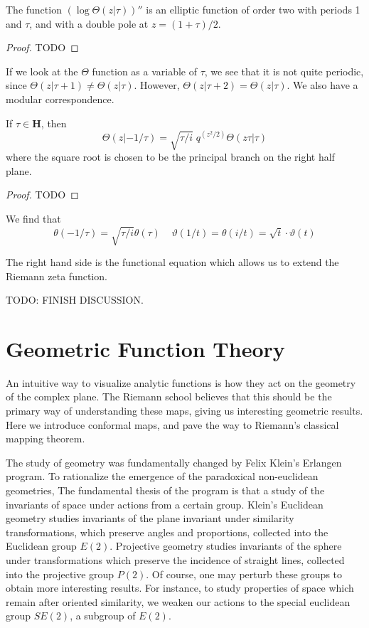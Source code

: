 \begin{corollary}
    The function $(\log \Theta(z|\tau))''$ is an elliptic function of order two with periods 1 and $\tau$, and with a double pole at $z = (1 + \tau)/2$.
\end{corollary}
\begin{proof}
    TODO
\end{proof}

If we look at the $\Theta$ function as a variable of $\tau$, we see that it is not quite periodic, since $\Theta(z|\tau+1) \neq \Theta(z|\tau)$. However, $\Theta(z|\tau+2) = \Theta(z|\tau)$. We also have a modular correspondence.

\begin{theorem}
    If $\tau \in \mathbf{H}$, then
    \[ \Theta(z|-1/\tau) = \sqrt{\tau/i}\; q^{(z^2/2)} \Theta(z\tau|\tau) \]
    where the square root is chosen to be the principal branch on the right half plane.
\end{theorem}
\begin{proof}
    TODO
\end{proof}

\begin{corollary}
    We find that
    \[ \theta(-1/\tau) = \sqrt{\tau/i} \theta(\tau)\ \ \ \ \ \vartheta(1/t) = \theta(i/t) = \sqrt{t} \cdot \vartheta(t) \]

    The right hand side is the functional equation which allows us to extend the Riemann zeta function.
\end{corollary}

TODO: FINISH DISCUSSION.






\chapter{Geometric Function Theory}

An intuitive way to visualize analytic functions is how they act on the geometry of the complex plane. The Riemann school believes that this should be the primary way of understanding these maps, giving us interesting geometric results. Here we introduce conformal maps, and pave the way to Riemann's classical mapping theorem.

The study of geometry was fundamentally changed by Felix Klein's Erlangen program. To rationalize the emergence of the paradoxical non-euclidean geometries, The fundamental thesis of the program is that a study of the invariants of space under actions from a certain group. Klein's Euclidean geometry studies invariants of the plane invariant under similarity transformations, which preserve angles and proportions, collected into the Euclidean group $E(2)$. Projective geometry studies invariants of the sphere under transformations which preserve the incidence of straight lines, collected into the projective group $P(2)$. Of course, one may perturb these groups to obtain more interesting results. For instance, to study properties of space which remain after oriented similarity, we weaken our actions to the special euclidean group $SE(2)$, a subgroup of $E(2)$.

